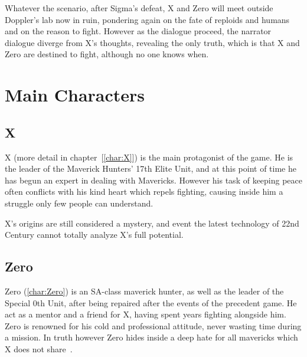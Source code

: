 Whatever the scenario, after Sigma's defeat, X and Zero will meet outside Doppler's lab now in ruin, pondering again on the fate of reploids and humans and on the reason to fight. However as the dialogue proceed, the narrator dialogue diverge from X's thoughts, revealing the only truth, which is that X and Zero are destined to fight, although no one knows when.

\section{Main Characters}
\subsection{X}
X (more detail in chapter~[\ref{char:X}]) is the main protagonist of the game. He is the leader of the Maverick Hunters' 17th Elite Unit, and at this point of time he has begun an expert in dealing with Mavericks. However his task of keeping peace often conflicts with his kind heart which repels fighting, causing inside him a struggle only few people can understand.

X's origins are still considered a mystery, and event the latest technology of 22nd Century cannot totally analyze X's full potential\cite{Xcoll1:Manual_X3}.
\subsection{Zero}
Zero (\ref{char:Zero}) is an SA-class maverick hunter, as well as the leader of the Special 0th Unit, after being repaired after the events of the precedent game. He act as a mentor and a friend for X, having spent years fighting alongside him. Zero is renowned for his cold and professional attitude, never wasting time during a mission. In truth however Zero hides inside a deep hate for all mavericks which X does not share~\cite{Xcoll1:Manual_X3}.

